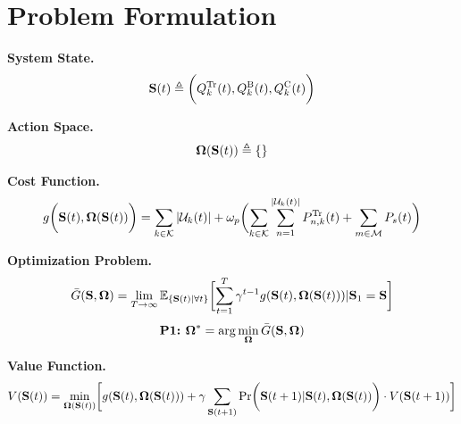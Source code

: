\section{Problem Formulation}
\label{sec:formulation}

\textbf{System State.}
\begin{align}
    \mathbf{S}(t) \triangleq 
    \bigg(
        Q_{k}^{\mathrm{Tr}}(t),
        Q_{k}^{\mathrm{B}}(t),
        Q_{k}^{\mathrm{C}}(t)
    \bigg)
\end{align}

\textbf{Action Space.}
\begin{align}
    \boldsymbol{\Omega}(\mathbf{S}(t)) \triangleq \{
    \}
\end{align}

\textbf{Cost Function.}
\begin{align}
    g\Paren{\Stat(t), \Policy(\Stat(t))} =
        \sum_{k\in\mathcal{K}} |\mathcal{U}_{k}(t)| +
        \omega_{p} \Paren{
            \sum_{k\in\mathcal{K}}\sum_{n=1}^{|\mathcal{U}_{k}(t)|} P_{n,k}^{\mathrm{Tr}}(t) + \sum_{m\in\mathcal{M}} P_{s}(t)
        }
\end{align}

\textbf{Optimization Problem.}
\begin{align}
    \bar{G} (\Stat, \Policy) = \lim_{T\to\infty}
    \Expect_{\set{\Stat(t)|\forall t}} \Bracket{
        \sum_{t=1}^{T} \gamma^{t-1} g(\Stat(t), \Policy(\Stat(t))) | \Stat_1=\Stat
    }
\end{align}
\begin{align}
    \textbf{P1:~}
    \boldsymbol{\Omega}^* = \arg\min\limits_{\boldsymbol{\Omega}} \bar{G}(\mathbf{S}, \boldsymbol{\Omega})
\end{align}

\textbf{Value Function.}
\begin{align}
    V(\Stat(t)) = \min_{\Policy(\Stat(t))} \Bracket{
        g(\Stat(t), \Policy(\Stat(t))) +
        \gamma \sum_{\Stat(t+1)} \Pr\Paren{\Stat(t+1) | \Stat(t), \Policy(\Stat(t))} \cdot V(\Stat(t+1))
    }
\end{align}
